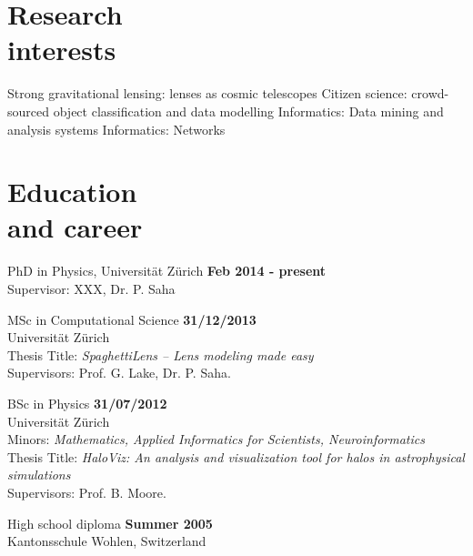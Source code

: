 \documentclass[a4paper,margin,line,useAMS,usenatbib]{resume}
\def\tb{\textbullet\;}
\begin{document}
\begin{resume}
\section{\mysidestyle Research\\interests}

  \tb Strong gravitational lensing: lenses as cosmic telescopes
  \tb Citizen science: crowd-sourced object classification and data modelling
  \tb Informatics: Data mining and analysis systems
  \tb Informatics: Networks


\section{\mysidestyle Education\\ and career}

\begin{list2}

  \item  PhD in Physics, Universität Zürich  \hfill {\bf Feb 2014 - present}\\
  {\small Supervisor: XXX, Dr. P. Saha}

  \item MSc in Computational Science \hfill {\bf 31/12/2013}\\
  Universität Zürich \\
  {\small Thesis Title: \emph{SpaghettiLens -- Lens modeling made easy} \\
  Supervisors: Prof. G. Lake, Dr. P. Saha}.

  \item BSc in Physics \hfill {\bf 31/07/2012}\\
  Universität Zürich \\
  {\small Minors: \emph{Mathematics, Applied Informatics for Scientists, Neuroinformatics}\\
  Thesis Title: \emph{HaloViz: An analysis and visualization tool for halos in astrophysical simulations} \\
  Supervisors: Prof. B. Moore}.

  \item High school diploma \hfill {\bf Summer 2005}\\
  Kantonsschule Wohlen, Switzerland

\end{list2}




\end{resume}
\end{document}
